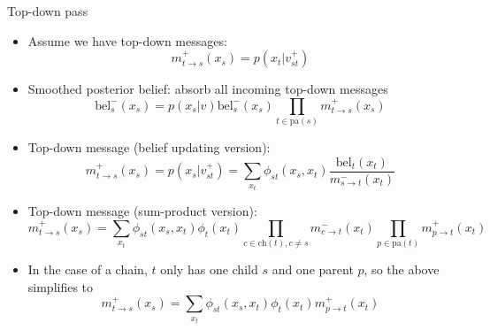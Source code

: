 \documentclass[10pt,mathserif]{beamer}
\begin{document}
\begin{frame}{Top-down pass}
\begin{itemize}
    \item Assume we have top-down messages:
    \begin{equation}
        m_{t\rightarrow s}^+ (x_s ) =  p(x_t|v_{st}^+)
    \end{equation}
    
    \item Smoothed posterior belief: absorb all incoming top-down messages
    \begin{equation}
        \text{bel}_s^-(x_s) = p(x_s|v)
        \text{bel}_s^-(x_s)
        \prod_{t\in\text{pa}(s)} m_{t\rightarrow s}^+ (x_s)
    \end{equation}
    
    \item Top-down message (belief updating version):
    \begin{equation}
        m_{t\rightarrow s}^+ (x_s) = p(x_s|v_{st}^+) = \sum_{x_t}\phi_{st}(x_s,x_t)\frac{\text{bel}_t(x_t)}{m_{s\rightarrow t}^- (x_t)}
    \end{equation}
    
    \item Top-down message (sum-product version):
    \begin{equation}
        m_{t\rightarrow s}^+ (x_s) = \sum_{x_t}\phi_{st}(x_s,x_t)\phi_t(x_t)\prod_{c\in\text{ch}(t),c\neq s} m_{c\rightarrow t}^- (x_t)\prod_{p\in\text{pa}(t)} m_{p\rightarrow t}^+ (x_t)
    \end{equation}
    
    \item In the case of a chain, $t$ only has one child $s$ and one parent $p$, so the above simplifies to
    \begin{equation}
        m_{t\rightarrow s}^+ (x_s) = \sum_{x_t}\phi_{st}(x_s,x_t)\phi_t(x_t) m_{p\rightarrow t}^+ (x_t)
    \end{equation}
\end{itemize}
\end{frame}
\end{document}
